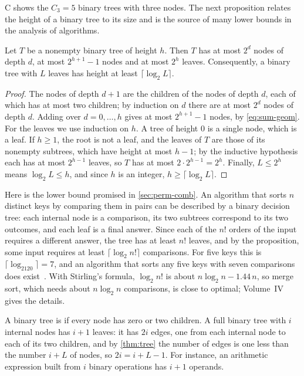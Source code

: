 C shows the $C_3=5$ binary trees with three nodes. The next proposition relates the height of a binary tree to its size and is the source of many lower bounds in the analysis of algorithms.

\begin{proposition}
\label{prop:binary-height}
Let $T$ be a nonempty binary tree of height $h$. Then $T$ has at most $2^d$ nodes of depth $d$, at most $2^{h+1}-1$ nodes and at most $2^h$ leaves. Consequently, a binary tree with $L$ leaves has height at least $\lceil\log_2L\rceil$.
\end{proposition}

\begin{proof}
The nodes of depth $d+1$ are the children of the nodes of depth $d$, each of which has at most two children; by induction on $d$ there are at most $2^d$ nodes of depth $d$. Adding over $d=0,\ldots,h$ gives at most $2^{h+1}-1$ nodes, by \eqref{eq:sum-geom}. For the leaves we use induction on $h$. A tree of height $0$ is a single node, which is a leaf. If $h\ge1$, the root is not a leaf, and the leaves of $T$ are those of its nonempty subtrees, which have height at most $h-1$; by the inductive hypothesis each has at most $2^{h-1}$ leaves, so $T$ has at most $2\cdot2^{h-1}=2^h$. Finally, $L\le2^h$ means $\log_2L\le h$, and since $h$ is an integer, $h\ge\lceil\log_2L\rceil$.
\end{proof}

Here is the lower bound promised in \cref{sec:perm-comb}. An algorithm that sorts $n$ distinct keys by comparing them in pairs can be described by a binary decision tree: each internal node is a comparison, its two subtrees correspond to its two outcomes, and each leaf is a final answer. Since each of the $n!$ orders of the input requires a different answer, the tree has at least $n!$ leaves, and by the proposition, some input requires at least $\lceil\log_2n!\rceil$ comparisons. For five keys this is $\lceil\log_2120\rceil=7$, and an algorithm that sorts any five keys with seven comparisons does exist~\cite[Sect.~5.3.1]{knuth1998taocp3}. With Stirling's formula, $\log_2n!$ is about $n\log_2n-1.44\,n$, so merge sort, which needs about $n\log_2n$ comparisons, is close to optimal; Volume~IV gives the details.

A binary tree is  if every node has zero or two children. A full binary tree with $i$ internal nodes has $i+1$ leaves: it has $2i$ edges, one from each internal node to each of its two children, and by \cref{thm:tree} the number of edges is one less than the number $i+L$ of nodes, so $2i=i+L-1$. For instance, an arithmetic expression built from $i$ binary operations has $i+1$ operands.

